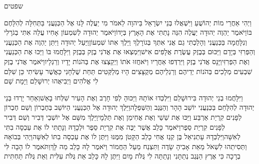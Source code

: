 \documentclass[../main/main.tex]{subfiles}
\begin{document}
\thispagestyle{empty}
\Incipit{}שפטים
\cleardoublepage
\RTLmulticolcolumns
\begin{multicols*}{\ncols}
וַיְהִי אַחֲרֵי מוֹת יְהוֹשֻׁעַ וַיִּשְׁאֲלוּ בְּנֵי יִשְׂרָאֵל בַּיהוָה לֵאמֹר מִי יַעֲלֶה לָּנוּ אֶל הַכְּנַעֲנִי בַּתְּחִלָּה לְהִלָּחֶם בּוֹ\PreVerseSpace{}וַיֹּאמֶר יַהְוֶה יְהוּדָה יַעֲלֶה הִנֵּה נָתַתִּי אֶת הָאָרֶץ בְּיָדוֹ\PreVerseSpace{}וַיֹּאמֶר יְהוּדָה לְשִׁמְעוֹן אָחִיו עֲלֵה אִתִּי בְגֹרָלִי וְנִלָּחֲמָה בַּכְּנַעֲנִי וְהָלַכְתִּי גַם אֲנִי אִתְּךָ בְּגוֹרָלֶךָ וַיֵּלֶךְ אִתּוֹ שִׁמְעוֹן\PreVerseSpace{}וַיַּעַל יְהוּדָה וַיִּתֵּן יַהְוֶה אֶת הַכְּנַעֲנִי וְהַפְּרִזִּי בְּיָדָם וַיַּכּוּם בְּבֶזֶק עֲשֶׂרֶת אֲלָפִים אִישׁ\PreVerseSpace{}וַיִּמְצְאוּ אֶת אֲדֹנִי בֶזֶק בְּבֶזֶק וַיִּלָּחֲמוּ בּוֹ וַיַּכּוּ אֶת הַכְּנַעֲנִי וְאֶת הַפְּרִזִּי\PreVerseSpace{}וַיָּנָס אֲדֹנִי בֶזֶק וַיִּרְדְּפוּ אַחֲרָיו וַיֹּאחֲזוּ אֹתוֹ וַיְקַצְּצוּ אֶת בְּהֹנוֹת יָדָיו וְרַגְלָיו\PreVerseSpace{}וַיֹּאמֶר אֲדֹנִי בֶזֶק שִׁבְעִים מְלָכִים בְּהֹנוֹת יְדֵיהֶם וְרַגְלֵיהֶם מְקֻצָּצִים הָיוּ מְלַקְּטִים תַּחַת שֻׁלְחָנִי כַּאֲשֶׁר עָשִׂיתִי כֵּן שִׁלַּם לִי אֱלֹהִים וַיְבִיאֻהוּ יְרוּשָׁלֵם וַיָּמָת שָׁם\OpenSection{}\par
{}וַיִּלָּחֲמוּ בְנֵי יְהוּדָה בִּירוּשָׁלֵם וַיִּלְכְּדוּ אוֹתָהּ וַיַּכּוּהָ לְפִי חָרֶב וְאֶת הָעִיר שִׁלְּחוּ בָאֵשׁ\PreVerseSpace{}וְאַחַר יָרְדוּ בְּנֵי יְהוּדָה לְהִלָּחֵם בַּכְּנַעֲנִי יוֹשֵׁב הָהָר וְהַנֶּגֶב וְהַשְּׁפֵלָה\PreVerseSpace{}וַיֵּלֶךְ יְהוּדָה אֶל הַכְּנַעֲנִי הַיּוֹשֵׁב בְּחֶבְרוֹן וְשֵׁם חֶבְרוֹן לְפָנִים קִרְיַת אַרְבַּע וַיַּכּוּ אֶת שֵׁשַׁי וְאֶת אֲחִימַן וְאֶת תַּלְמָי\PreVerseSpace{}וַיֵּלֶךְ מִשָּׁם אֶל יוֹשְׁבֵי דְּבִיר וְשֵׁם דְּבִיר לְפָנִים קִרְיַת סֵפֶר\PreVerseSpace{}וַיֹּאמֶר כָּלֵב אֲשֶׁר יַכֶּה אֶת קִרְיַת סֵפֶר וּלְכָדָהּ וְנָתַתִּי לוֹ אֶת עַכְסָה בִתִּי לְאִשָּׁה\PreVerseSpace{}וַיִּלְכְּדָהּ עָתְנִיאֵל בֶּן קְנַז אֲחִי כָלֵב הַקָּטֹן מִמֶּנּוּ וַיִּתֶּן לוֹ אֶת עַכְסָה בִתּוֹ לְאִשָּׁה\PreVerseSpace{}וַיְהִי בְּבוֹאָהּ וַתְּסִיתֵהוּ לִשְׁאֹל מֵאֵת אָבִיהָ שָׂדֶה\SubEnd{} וַתִּצְנַח מֵעַל הַחֲמוֹר וַיֹּאמֶר לָהּ כָּלֵב מַה לָּךְ\PreVerseSpace{}וַתֹּאמֶר לוֹ הָבָה לִּי בְרָכָה כִּי אֶרֶץ הַנֶּגֶב נְתַתָּנִי וְנָתַתָּה לִי גֻּלֹּת מָיִם וַיִּתֶּן לָהּ כָּלֵב אֵת גֻּלֹּת עִלִּית וְאֵת גֻּלֹּת תַּחְתִּית\OpenSection{}\par

\end{multicols*}
\end{document}
